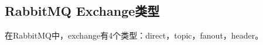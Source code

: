 \documentclass[../../../interview-questions.tex]{subfiles}
\begin{document}
\subsection{RabbitMQ Exchange类型}

在RabbitMQ中，exchange有4个类型：direct，topic，fanout，header。
\end{document}
